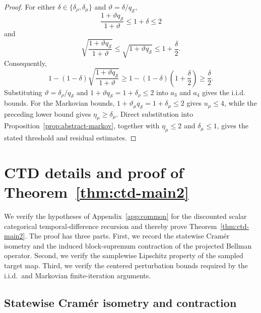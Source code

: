\documentclass{article}
\newcommand{\X}{\mathcal{S}}
\begin{document}
\begin{proof}
For either $\delta\in\{\delta_\rho,\delta_\mu\}$ and $\vartheta=\delta/q_{\X}$,
\begin{equation}
\frac{1+\vartheta q_{\X}}{1+\vartheta}\le1+\delta\le2
\end{equation}
and
\begin{equation}
\sqrt{\frac{1+\vartheta q_{\X}}{1+\vartheta}}\le\sqrt{1+\vartheta q_{\X}}\le1+\frac{\delta}{2}.
\end{equation}
Consequently,
\begin{equation}
1-(1-\delta)\sqrt{\frac{1+\vartheta q_{\X}}{1+\vartheta}}\ge1-(1-\delta)\left(1+\frac{\delta}{2}\right)\ge\frac{\delta}{2}.
\end{equation}
Substituting $\vartheta=\delta_\rho/q_{\X}$ and $1+\vartheta q_{\X}=1+\delta_\rho\le2$ into $a_3$ and $a_4$ gives the i.i.d. bounds. For the Markovian bounds, $1+\vartheta_\mu q_{\X}=1+\delta_\mu\le2$ gives $u_\mu\le4$, while the preceding lower bound gives $\eta_\mu\ge\delta_\mu$. Direct substitution into Proposition~\ref{prop:abstract-markov}, together with $\eta_\mu\le2$ and $\delta_\mu\le1$, gives the stated threshold and residual estimates.
\end{proof}

\section{CTD details and proof of Theorem~\ref{thm:ctd-main2}}
\label{app:ctd}

We verify the hypotheses of Appendix~\ref{app:common} for the discounted scalar categorical temporal-difference recursion and thereby prove Theorem~\ref{thm:ctd-main2}. The proof has three parts. First, we record the statewise Cram\'er isometry and the induced block-supremum contraction of the projected Bellman operator. Second, we verify the samplewise Lipschitz property of the sampled target map. Third, we verify the centered perturbation bounds required by the i.i.d.\ and Markovian finite-iteration arguments.

\subsection{Statewise Cram\'er isometry and contraction}
\end{document}

